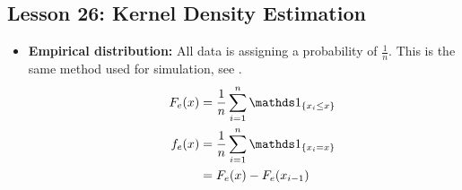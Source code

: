 \documentclass[10pt, french]{article}
\begin{document}
\begin{multicols*}{3}
\section*{Lesson 26: Kernel Density Estimation}
\begin{itemize}[align=left,leftmargin=*]
    \item \textbf{Empirical distribution:} All data is assigning a probability of $\frac{1}{n}$. This is the same method used for simulation, see {\color{orange}}.
    \begin{align*}
        \hspace*{.5cm}
        F_e(x) &= \frac{1}{n} \sum\limits_{i=1}^{n} \indic{x_i \leq x} \\
        f_e(x) &= \frac{1}{n} \sum\limits_{i=1}^{n} \indic{x_i = x} \\
               &= F_e(x) - F_e(x_{i-1})
    \end{align*}


\end{itemize}
\end{multicols*}
\end{document}
